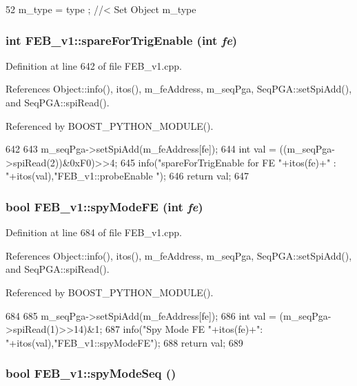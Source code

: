 \begin{DoxyCode}
52 { m_type  = type  ; } //< Set Object m_type
\end{DoxyCode}
\hypertarget{classFEB__v1_a76d86fb9e9be48e704257070675ae1cc}{
\subsubsection[{spareForTrigEnable}]{\setlength{\rightskip}{0pt plus 5cm}int FEB\_\-v1::spareForTrigEnable (int {\em fe})}}
\label{classFEB__v1_a76d86fb9e9be48e704257070675ae1cc}


Definition at line 642 of file FEB\_\-v1.cpp.

References Object::info(), itos(), m\_\-feAddress, m\_\-seqPga, SeqPGA::setSpiAdd(), and SeqPGA::spiRead().

Referenced by BOOST\_\-PYTHON\_\-MODULE().


\begin{DoxyCode}
642                                     {
643   m_seqPga->setSpiAdd(m_feAddress[fe]);
644   int val = ((m_seqPga->spiRead(2))&0xF0)>>4;
645   info("spareForTrigEnable for FE "+itos(fe)+" : "+itos(val),"FEB_v1::probeEnable
      ");
646   return val;
647 }
\end{DoxyCode}
\hypertarget{classFEB__v1_a0b6d25515e575e370552c6b6f715fd76}{
\subsubsection[{spyModeFE}]{\setlength{\rightskip}{0pt plus 5cm}bool FEB\_\-v1::spyModeFE (int {\em fe})}}
\label{classFEB__v1_a0b6d25515e575e370552c6b6f715fd76}


Definition at line 684 of file FEB\_\-v1.cpp.

References Object::info(), itos(), m\_\-feAddress, m\_\-seqPga, SeqPGA::setSpiAdd(), and SeqPGA::spiRead().

Referenced by BOOST\_\-PYTHON\_\-MODULE().


\begin{DoxyCode}
684                               {
685   m_seqPga->setSpiAdd(m_feAddress[fe]);
686   int val = (m_seqPga->spiRead(1)>>14)&1;
687   info("Spy Mode FE "+itos(fe)+": "+itos(val),"FEB_v1::spyModeFE");
688   return val;
689 }
\end{DoxyCode}
\hypertarget{classFEB__v1_a3ec8b74aedfbe5e3d3ce0d4b4eb44330}{
\subsubsection[{spyModeSeq}]{\setlength{\rightskip}{0pt plus 5cm}bool FEB\_\-v1::spyModeSeq ()}}
\label{classFEB__v1_a3ec8b74aedfbe5e3d3ce0d4b4eb44330}


